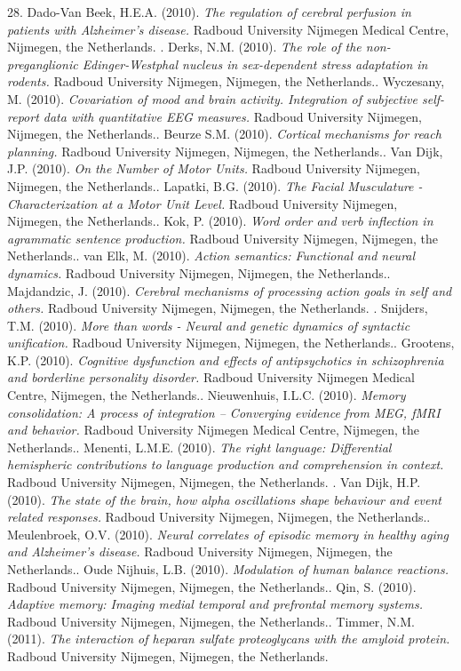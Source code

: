 28.	Dado-Van Beek, H.E.A. (2010). \emph{The regulation of cerebral perfusion in patients with Alzheimer's disease.} Radboud University Nijmegen Medical Centre, Nijmegen, the Netherlands.  \npar {}.	Derks, N.M. (2010). \emph{The role of the non-preganglionic Edinger-Westphal nucleus in sex-dependent stress adaptation in rodents.} Radboud University Nijmegen, Nijmegen, the Netherlands.\npar {}.	Wyczesany, M. (2010). \emph{Covariation of mood and brain activity. Integration of subjective self-report data with quantitative EEG measures.} Radboud University Nijmegen, Nijmegen, the Netherlands.\npar {}.	Beurze S.M. (2010). \emph{Cortical mechanisms for reach planning.} Radboud University Nijmegen, Nijmegen, the Netherlands.\npar {}.	Van Dijk, J.P. (2010). \emph{On the Number of Motor Units.} Radboud University Nijmegen, Nijmegen, the Netherlands.\npar {}.	Lapatki, B.G. (2010). \emph{The Facial Musculature - Characterization at a Motor Unit Level.} Radboud University Nijmegen, Nijmegen, the Netherlands.\npar {}.	Kok, P. (2010). \emph{Word order and verb inflection in agrammatic sentence production.} Radboud University Nijmegen, Nijmegen, the Netherlands.\npar {}.	van Elk, M. (2010). \emph{Action semantics: Functional and neural dynamics.} Radboud University Nijmegen, Nijmegen, the Netherlands.\npar {}.	Majdandzic, J. (2010). \emph{Cerebral mechanisms of processing action goals in self and others.} Radboud University Nijmegen, Nijmegen, the Netherlands.  \npar {}.	Snijders, T.M. (2010). \emph{More than words - Neural and genetic dynamics of syntactic unification.} Radboud University Nijmegen, Nijmegen, the Netherlands.\npar {}.	Grootens, K.P. (2010). \emph{Cognitive dysfunction and effects of antipsychotics in schizophrenia and borderline personality disorder.} Radboud University Nijmegen Medical Centre, Nijmegen, the Netherlands.\npar {}.	Nieuwenhuis, I.L.C. (2010). \emph{Memory consolidation: A process of integration – Converging evidence from MEG, fMRI and behavior.} Radboud University Nijmegen Medical Centre, Nijmegen, the Netherlands.\npar {}.	Menenti, L.M.E. (2010). \emph{The right language: Differential hemispheric contributions to language production and comprehension in context.} Radboud University Nijmegen, Nijmegen, the Netherlands. \npar {}.	Van Dijk, H.P. (2010). \emph{The state of the brain, how alpha oscillations shape behaviour and event related responses.} Radboud University Nijmegen, Nijmegen, the Netherlands.\npar {}.	Meulenbroek, O.V. (2010). \emph{Neural correlates of episodic memory in healthy aging and Alzheimer's disease.} Radboud University Nijmegen, Nijmegen, the Netherlands.\npar {}.	Oude Nijhuis, L.B. (2010). \emph{Modulation of human balance reactions.} Radboud University Nijmegen, Nijmegen, the Netherlands.\npar {}.	Qin, S. (2010). \emph{Adaptive memory: Imaging medial temporal and prefrontal memory systems.} Radboud University Nijmegen, Nijmegen, the Netherlands.\npar {}.	Timmer, N.M. (2011). \emph{The interaction of heparan sulfate proteoglycans with the amyloid protein.} Radboud University Nijmegen, Nijmegen, the Netherlands.\npar \noindent 
